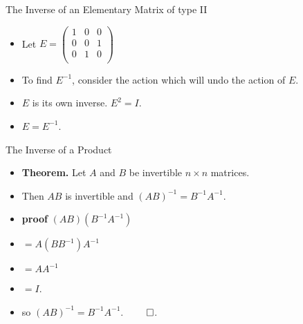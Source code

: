 \documentclass{beamer}
\begin{document}
\begin{frame}{The Inverse of an Elementary Matrix of type II}

\begin{itemize}
\item Let $E=
\begin{pmatrix}
1 & 0 & 0 \\
0 & 0 & 1 \\
0 & 1 & 0 \\
\end{pmatrix}
$
\item To find $E^{-1}$, consider the action which will undo the action
of $E$.
\item $E$ is its own inverse. $E^2=I$.
\item $E=E^{-1}$.
\end{itemize}
\end{frame}

\begin{frame}{The Inverse of a Product}

\begin{itemize}
\item \textbf{Theorem.} Let $A$ and $B$ be invertible $n\times n$ matrices.
\item Then $AB$ is invertible and $\left(AB\right)^{-1} = B^{-1} A^{-1}$.
\item \textbf{proof} $\left(AB\right)\left(B^{-1} A^{-1}\right)$
\item $= A(B B^{-1})A^{-1}$
\item $= A A^{-1}$
\item $=I$.
\item so $(AB)^{-1} = B^{-1} A^{-1}$. $\qed$.
\end{itemize}
\end{frame}
\end{document}
